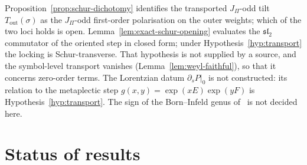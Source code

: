 \documentclass[11pt]{article}
\theoremstyle{definition}
\begin{document}
    Proposition~\ref{prop:schur-dichotomy} identifies the transported $J_\Pi$-odd tilt $T_{\mathrm{out}}(\sigma)$ as the
    $J_\Pi$-odd first-order polarisation on the outer weights; which of the two loci holds is open.
    Lemma~\ref{lem:exact-schur-opening} evaluates the $\mathfrak{sl}_2$ commutator of the oriented step in closed form;
    under Hypothesis~\ref{hyp:transport} the locking is Schur-transverse.
    That hypothesis is not supplied by a source, and the symbol-level transport vanishes
    (Lemma~\ref{lem:weyl-faithful}), so that it concerns zero-order terms.
    The Lorentzian datum $\partial_sP|_0$ is not constructed: its relation to the metaplectic step
    $g(x,y)=\exp(xE)\exp(yF)$ is Hypothesis~\ref{hyp:transport}.
    The sign of the Born--Infeld genus of~\cite{Beau2026bim} is not decided here.

  \section{Status of results}
    \label{sec:status}
\end{document}
